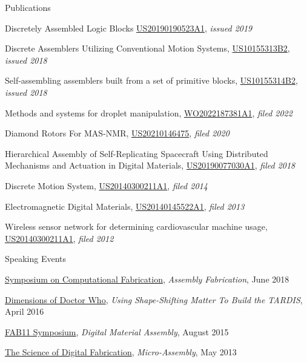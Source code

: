 \documentclass{resume} %
\begin{document}
\begin{rSection}{Publications}
\begingroup\leftskip=0.7cm


Discretely Assembled Logic Blocks \href{https://patents.google.com/patent/US20190190523A1}{US20190190523A1}, {\em issued 2019}

Discrete Assemblers Utilizing Conventional Motion Systems, \href{https://patents.google.com/patent/US10155313B2/}{US10155313B2}, {\em issued 2018}

Self-assembling assemblers %
built from a set of primitive blocks, \href{https://patents.google.com/patent/US10155314B2}{US10155314B2}, {\em issued 2018}

Methods and systems for droplet manipulation, \href{https://patents.google.com/patent/WO2022187381A1}{WO2022187381A1}, {\em filed 2022}

Diamond Rotors For MAS-NMR, \href{https://patents.google.com/patent/US20210146475}{US20210146475}, {\em filed 2020}

Hierarchical Assembly of Self-Replicating Spacecraft Using Distributed Mechanisms and Actuation in Digital Materials, \href{https://patents.google.com/patent/US20190077030A1/}{US20190077030A1}, {\em filed 2018}

Discrete Motion System, \href{https://patents.google.com/patent/US20140300211A1/}{US20140300211A1}, {\em filed 2014}

Electromagnetic Digital Materials, \href{https://patents.google.com/patent/US20140145522A1}{US20140145522A1}, {\em filed 2013}

Wireless sensor network for determining cardiovascular machine usage, \href{https://patents.google.com/patent/US20130127636A1}{US20140300211A1}, {\em filed 2012}

\endgroup

\end{rSection}


\begin{rSection}{Speaking Events}

\href{http://cba.mit.edu/events/18.06.SCF/}{Symposium on Computational Fabrication}, {\em Assembly Fabrication}, June 2018

\href{https://mitmuseum.mit.edu/program/dimensions-doctor-who}{Dimensions of Doctor Who}, {\em Using Shape-Shifting Matter To Build the TARDIS}, April 2016

\href{http://fab11.fabevent.org/#}{FAB11 Symposium}, {\em Digital Material Assembly}, August 2015

\href{http://cba.mit.edu/events/13.03.scifab/index.html}{The Science of Digital Fabrication}, {\em Micro-Assembly}, May 2013

\end{rSection}
\end{document}
